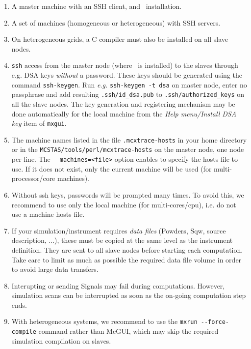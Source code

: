   \begin{enumerate}
  \item{A master machine with an SSH client, and \MCX\ installation.}
  \item{A set of machines (homogeneous or heterogeneous) with SSH servers.}
  \item{On heterogeneous grids, a C compiler must also be installed on all slave nodes.}
  \item{\texttt{ssh} access from the master node (where \MCX\ is
      installed) to the slaves through e.g. DSA keys \emph{without} a
      password. These keys should be generated using the command
      \texttt{ssh-keygen}. Run \emph{e.g.} \texttt{ssh-keygen -t dsa} on
      master node, enter no passphrase and add resulting
      \texttt{.ssh/id\_dsa.pub} to \texttt{.ssh/authorized\_keys}
      on all the slave nodes. The key generation and registering mechanism 
      may be done automatically for the local machine from the 
      \emph{Help menu/Install DSA key} item of \verb+mxgui+.}
  \item{The machine names listed in the file \texttt{.mcxtrace-hosts} in
      your home directory or in the \texttt{MCSTAS/tools/perl/mcxtrace-hosts} on
      the master node, one node per line. The \verb'--machines=<file>' option
      enables to specify the hosts file to use. If it does not exist, only 
      the current machine will be used (for multi-processor/core machines).}
  \item{Without ssh keys, passwords will be prompted many times. To avoid this, 
      we recommend to use only the local machine (for multi-cores/cpu), i.e. do
      not use a machine hosts file.}
  \item{If your simulation/instrument requires \emph{data files} (Powders, Sqw, source 
      description, ...), these must be copied at the same level as the instrument 
      definition. They are sent to all slave nodes before starting each computation.
      Take care to limit as much as possible the required data file volume in order
      to avoid large data transfers.}
  \item Interupting or sending Signals may fail during computations. However, 
  simulation scans can be interrupted as soon as the on-going computation 
  step ends.
  \item With heterogeneous systems, we recommend to use the \verb+mxrun --force-compile+ 
    command rather than McGUI, which may skip the required simulation compilation
    on slaves.
  \end{enumerate}

